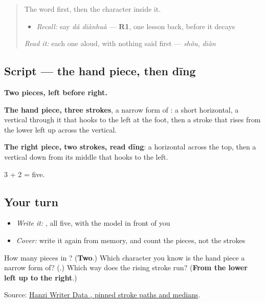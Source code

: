 \begin{quote}
The word first, then the character inside it.

\begin{itemize}
\raggedright
  \item \emph{Recall:} say \emph{dǎ diànhuà} — \textbf{R1}, one lesson back, before it decays
\end{itemize}

\begin{quote}
 
\end{quote}

\emph{Read it:} each one aloud, with nothing said first — \emph{shǒu}, \emph{diàn}
\end{quote}

\subsection*{Script — the hand piece, then dīng}

\begin{quote}
\end{quote}

\textbf{Two pieces, left before right.}

\textbf{The hand piece, three strokes}, a narrow form of : a short horizontal, a vertical through it that hooks to the left at the foot, then a stroke that rises from the lower left up across the vertical.

\textbf{The right piece, two strokes, read dīng}: a horizontal across the top, then a vertical down from its middle that hooks to the left.

3 + 2 = five.

\subsection*{Your turn}
\begin{itemize}
\raggedright
  \item \emph{Write it:} , all five, with the model in front of you
  \item \emph{Cover:} write it again from memory, and count the pieces, not the strokes
\end{itemize}

\begin{tcolorbox}[breakable,colback=teal!4,colframe=teal!35!black,title={Before you move on}]
How many pieces in ? (\textbf{Two}.) Which character you know is the hand piece a narrow form of? (\textbf{}.) Which way does the rising stroke run? (\textbf{From the lower left up to the right}.)

Source: \href{https://raw.githubusercontent.com/chanind/hanzi-writer-data/68d10a4b21150cae5e1ebbd223eed289cf32d90c/data/\%E6\%89\%93.json}{Hanzi Writer Data , pinned stroke paths and medians}.
\end{tcolorbox}
